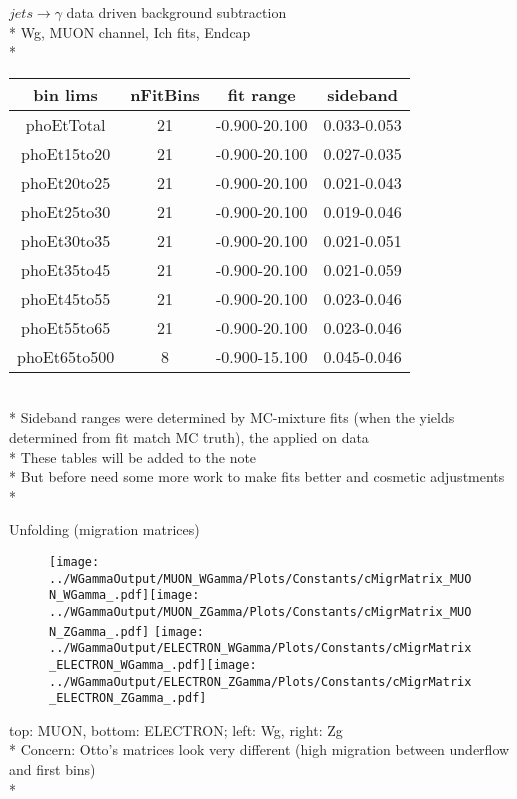 \documentclass{beamer}
\begin{document}
\begin{frame}{$jets \rightarrow \gamma$ data driven background subtraction}\\*
  Wg, MUON channel, Ich fits, Endcap\\*
  \begin{tabular}{|c|c|c|c|}
  bin lims & nFitBins & fit range & sideband \\ \hline
  phoEtTotal & 21 & -0.900-20.100 & 0.033-0.053 \\ \hline
  phoEt15to20 & 21 & -0.900-20.100 & 0.027-0.035 \\ \hline
  phoEt20to25 & 21 & -0.900-20.100 & 0.021-0.043 \\ \hline
  phoEt25to30 & 21 & -0.900-20.100 & 0.019-0.046 \\ \hline
  phoEt30to35 & 21 & -0.900-20.100 & 0.021-0.051 \\ \hline
  phoEt35to45 & 21 & -0.900-20.100 & 0.021-0.059 \\ \hline
  phoEt45to55 & 21 & -0.900-20.100 & 0.023-0.046 \\ \hline
  phoEt55to65 & 21 & -0.900-20.100 & 0.023-0.046 \\ \hline
  phoEt65to500 & 8 & -0.900-15.100 & 0.045-0.046 \\ \hline
  \end{tabular}\\*
  \scriptsize Sideband ranges were determined by MC-mixture fits (when the yields determined from fit match MC truth), the applied on data\\* 
  \scriptsize These tables will be added to the note\\*
  \scriptsize But before need some more work to make fits better and cosmetic adjustments\\*
\end{frame}

\begin{frame}{Unfolding (migration matrices)}
  \begin{figure}
    \centering
    \texttt{[image: ../WGammaOutput/MUON\_WGamma/Plots/Constants/cMigrMatrix\_MUON\_WGamma\_.pdf]}\texttt{[image: ../WGammaOutput/MUON\_ZGamma/Plots/Constants/cMigrMatrix\_MUON\_ZGamma\_.pdf]}
    \texttt{[image: ../WGammaOutput/ELECTRON\_WGamma/Plots/Constants/cMigrMatrix\_ELECTRON\_WGamma\_.pdf]}\texttt{[image: ../WGammaOutput/ELECTRON\_ZGamma/Plots/Constants/cMigrMatrix\_ELECTRON\_ZGamma\_.pdf]}
  \end{figure}
  \scriptsize top: MUON, bottom: ELECTRON; left: Wg, right: Zg\\*
  \scriptsize Concern: Otto's matrices look very different (high migration between underflow and first bins)\\*
\end{frame}
\end{document}
